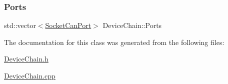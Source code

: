 \mbox{\label{classDeviceChain_a760e12bf0095431fe76563cc5d7969de}} 
\subsubsection{\texorpdfstring{Ports}{Ports}}
{\footnotesize\ttfamily std\+::vector$<$\hyperlink{classSocketCanPort}{Socket\+Can\+Port}$>$ Device\+Chain\+::\+Ports\hspace{0.3cm}{\ttfamily [private]}}



The documentation for this class was generated from the following files\+:\begin{DoxyCompactItemize}
\item 
\hyperlink{DeviceChain_8h}{Device\+Chain.\+h}\item 
\hyperlink{DeviceChain_8cpp}{Device\+Chain.\+cpp}\end{DoxyCompactItemize}
